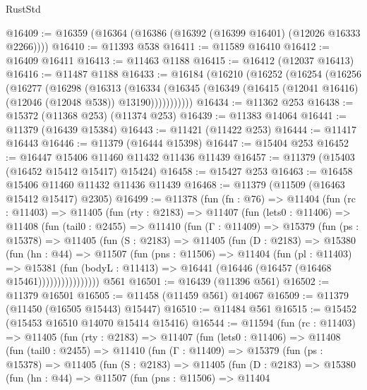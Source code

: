 \begin{lexlean}{RustStd}
\begin{coremodule}
@16409 := @16359 (@16364 (@16386 (@16392 (@16399 @16401) (@12026 @16333 @2266))))
@16410 := @11393 @538
@16411 := @11589 @16410
@16412 := @16409 @16411
@16413 := @11463 @1188
@16415 := @16412 (@12037 @16413)
@16416 := @11487 @1188
@16433 := @16184
    (@16210
      (@16252
        (@16254
          (@16256
            (@16277
              (@16298
                (@16313
                  (@16334
                    (@16345 (@16349 (@16415 (@12041 @16416) (@12046 (@12048 @538)) @13190)))))))))))
@16434 := @11362 @253
@16438 := @15372 (@11368 @253) (@11374 @253)
@16439 := @11383 @14064
@16441 := @11379 (@16439 @15384)
@16443 := @11421 (@11422 @253)
@16444 := @11417 @16443
@16446 := @11379 (@16444 @15398)
@16447 := @15404 @253
@16452 := @16447 @15406 @11460 @11432 @11436 @11439
@16457 := @11379 (@15403 (@16452 @15412 @15417) @15424)
@16458 := @15427 @253
@16463 := @16458 @15406 @11460 @11432 @11436 @11439
@16468 := @11379 (@11509 (@16463 @15412 @15417) @2305)
@16499 := @11378
    (fun (fn : @76) =>
    @11404
      (fun (rc : @11403) =>
      @11405
        (fun (rty : @2183) =>
        @11407
          (fun (lets0 : @11406) =>
          @11408
            (fun (tail0 : @2455) =>
            @11410
              (fun (Γ : @11409) =>
              @15379
                (fun (ps : @15378) =>
                @11405
                  (fun (S : @2183) =>
                  @11405
                    (fun (D : @2183) =>
                    @15380
                      (fun (hn : @44) =>
                      @11507
                        (fun (pns : @11506) =>
                        @11404
                          (fun (pl : @11403) =>
                          @15381
                            (fun (bodyL : @11413) =>
                            @16441 (@16446 (@16457 (@16468 @15461))))))))))))))))
    @561
@16501 := @16439 (@11396 @561)
@16502 := @11379 @16501
@16505 := @11458 (@11459 @561) @14067
@16509 := @11379 (@11450 (@16505 @15443) @15447)
@16510 := @11484 @561
@16515 := @15452 (@15453 @16510 @14070 @15414 @15416)
@16544 := @11594
    (fun (rc : @11403) =>
    @11405
      (fun (rty : @2183) =>
      @11407
        (fun (lets0 : @11406) =>
        @11408
          (fun (tail0 : @2455) =>
          @11410
            (fun (Γ : @11409) =>
            @15379
              (fun (ps : @15378) =>
              @11405
                (fun (S : @2183) =>
                @11405
                  (fun (D : @2183) =>
                  @15380
                    (fun (hn : @44) =>
                    @11507
                      (fun (pns : @11506) =>
                      @11404

\end{coremodule}
\end{lexlean}
